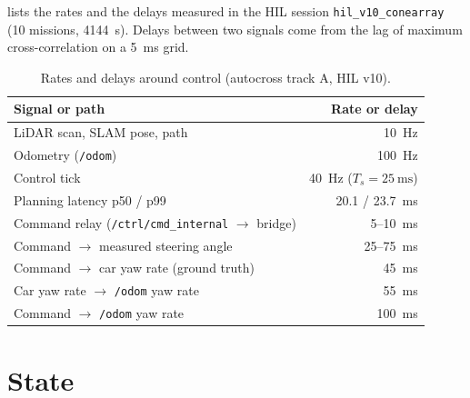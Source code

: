 \documentclass[11pt,a4paper]{article}
\begin{document}
 lists the rates and the delays measured in the HIL session
\texttt{hil\_v10\_conearray} (10 missions, \SI{4144}{\second}). Delays between two
signals come from the lag of maximum cross-correlation on a \SI{5}{\milli\second} grid.

\begin{table}[h]
\centering\small
\begin{tabular}{@{}lr@{}}
\toprule
Signal or path & Rate or delay \\
\midrule
LiDAR scan, SLAM pose, path & \SI{10}{\hertz} \\
Odometry (\texttt{/odom}) & \SI{100}{\hertz} \\
Control tick & \SI{40}{\hertz} ($T_s = \SI{25}{\milli\second}$) \\
Planning latency p50 / p99 & \SI{20.1}{} / \SI{23.7}{\milli\second} \\
Command relay (\texttt{/ctrl/cmd\_internal} $\to$ bridge) & 5--\SI{10}{\milli\second} \\
Command $\to$ measured steering angle & 25--\SI{75}{\milli\second} \\
Command $\to$ car yaw rate (ground truth) & \SI{45}{\milli\second} \\
Car yaw rate $\to$ \texttt{/odom} yaw rate & \SI{55}{\milli\second} \\
Command $\to$ \texttt{/odom} yaw rate & \SI{100}{\milli\second} \\
\bottomrule
\end{tabular}
\caption{Rates and delays around control (autocross track A, HIL v10).}
\label{tab:rates}
\end{table}

\section{State}
\end{document}
